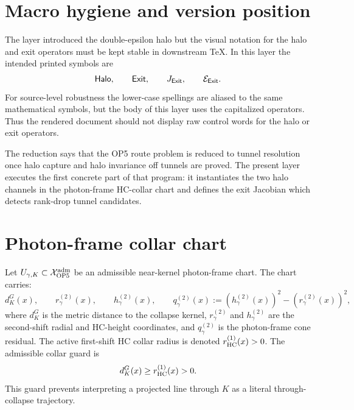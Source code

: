 \begin{abstract}
This delta layer executes the next proof obligation left by the local pass. The double-epsilon halo symbols are made typographically stable, the two halo channels are instantiated in the photon-frame near-kernel collar, and the exit Jacobian is defined as the differential of the paired radial/HC-residual channel. The result is a first conservative tunnel-menu execution: within the declared photon-frame halo grammar every boundary exit is assigned to one of the six tunnel classes. The layer does not close OP5 globally. It converts the next obstruction into explicit tests: collar admissibility, channel regularity, selector gating, rank-drop isolation, atlas-overlap compatibility, and zero hidden leakage/debt.
\end{abstract}

\section{Macro hygiene and version position}

The layer introduced the double-epsilon halo but the visual notation for the halo and exit operators must be kept stable in downstream TeX. In this layer the intended printed symbols are
\[
\mathsf{Halo},\qquad \mathsf{Exit},\qquad J_{\mathsf{Exit}},\qquad \mathcal E_{\mathsf{Exit}}.
\]
For source-level robustness the lower-case spellings are aliased to the same mathematical symbols, but the body of this layer uses the capitalized operators. Thus the rendered document should not display raw control words for the halo or exit operators.

The reduction says that the OP5 route problem is reduced to tunnel resolution once halo capture and halo invariance off tunnels are proved. The present layer executes the first concrete part of that program: it instantiates the two halo channels in the photon-frame HC-collar chart and defines the exit Jacobian which detects rank-drop tunnel candidates.

\section{Photon-frame collar chart}

\begin{definition}
Let \(U_{\gamma,K}\subset \mathcal X_{\mathrm{OP} 5}^{\mathrm{adm}}\) be an admissible near-kernel photon-frame chart. The chart carries:
\[
 d_K^G(x),\qquad r_{\gamma}^{(2)}(x),\qquad h_{\gamma}^{(2)}(x),\qquad q_{\gamma}^{(2)}(x):=(h_{\gamma}^{(2)}(x))^2-(r_{\gamma}^{(2)}(x))^2,
\]
where \(d_K^G\) is the metric distance to the collapse kernel, \(r_{\gamma}^{(2)}\) and \(h_{\gamma}^{(2)}\) are the second-shift radial and HC-height coordinates, and \(q_{\gamma}^{(2)}\) is the photon-frame cone residual. The active first-shift HC collar radius is denoted \(r_{\mathrm{HC}}^{(1)}(x)>0\). The admissible collar guard is
\[
 d_K^G(x)\ge r_{\mathrm{HC}}^{(1)}(x)>0.
\]
This guard prevents interpreting a projected line through \(K\) as a literal through-collapse trajectory.
\end{definition}

